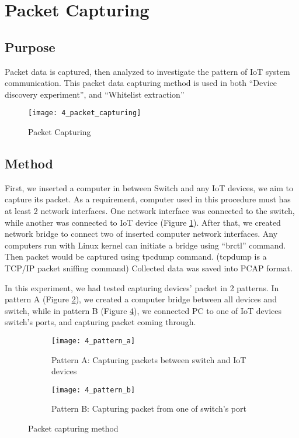 \section{Packet Capturing}
\label{packet_capture}
\subsection{Purpose}
Packet data is captured, then analyzed to investigate the pattern of IoT system communication. This packet data capturing method is used in both “Device discovery experiment”, and “Whitelist extraction” 

\begin{figure}[h]
    \centering 
    \texttt{[image: 4\_packet\_capturing]}
    \caption{Packet Capturing}
    \label{fig:s4_packet_capturing}
\end{figure}


\subsection{Method}
First, we inserted a computer in between Switch and any IoT devices, we aim to capture its packet. As a requirement, computer used in this procedure must has at least 2 network interfaces. One network interface was connected to the switch, while another was connected to IoT device (Figure \ref{fig:s4_packet_capturing}). After that, we created network bridge to connect two of inserted computer network interfaces. Any computers run with Linux kernel can initiate a bridge using “brctl” command. Then packet would be captured using tpcdump command. (tcpdump is a TCP/IP packet sniffing command) Collected data was saved into PCAP format. 

In this experiment, we had tested capturing devices’ packet in 2 patterns. In pattern A (Figure \ref{fig:s4_pattern_a}), we created a computer bridge between all devices and switch, while in pattern B (Figure \ref{fig:s4_pattern_b}), we connected PC to one of IoT devices switch’s ports, and capturing packet coming through.

\begin{figure}[h]
    \centering
    \begin{subfigure}[b]{0.35\textwidth}
        \centering
        \texttt{[image: 4\_pattern\_a]}
        \caption{Pattern A: Capturing packets between switch and IoT devices}
        \label{fig:s4_pattern_a}
    \end{subfigure}
    \hspace{1.5cm}
    \begin{subfigure}[b]{0.35\textwidth}
        \centering
        \texttt{[image: 4\_pattern\_b]}
        \caption{Pattern B: Capturing packet from one of switch's port}
        \label{fig:s4_pattern_b}
    \end{subfigure}
    \caption{Packet capturing method}
\end{figure}



